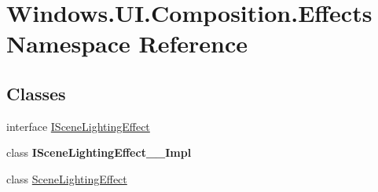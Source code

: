 \hypertarget{namespace_windows_1_1_u_i_1_1_composition_1_1_effects}{}\section{Windows.\+U\+I.\+Composition.\+Effects Namespace Reference}
\label{namespace_windows_1_1_u_i_1_1_composition_1_1_effects}
\subsection*{Classes}
\begin{DoxyCompactItemize}
\item 
interface \hyperlink{interface_windows_1_1_u_i_1_1_composition_1_1_effects_1_1_i_scene_lighting_effect}{I\+Scene\+Lighting\+Effect}
\item 
class {\bfseries I\+Scene\+Lighting\+Effect\+\_\+\+\_\+\+Impl}
\item 
class \hyperlink{class_windows_1_1_u_i_1_1_composition_1_1_effects_1_1_scene_lighting_effect}{Scene\+Lighting\+Effect}
\end{DoxyCompactItemize}

